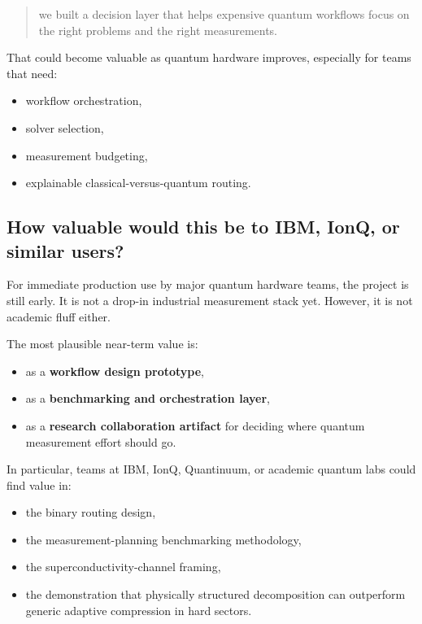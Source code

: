 \documentclass[11pt]{article}
\begin{document}
\begin{quote}
we built a decision layer that helps expensive quantum workflows focus on the right problems and the right measurements.
\end{quote}

That could become valuable as quantum hardware improves, especially for teams that need:

\begin{itemize}
\item workflow orchestration,
\item solver selection,
\item measurement budgeting,
\item explainable classical-versus-quantum routing.
\end{itemize}

\subsection{How valuable would this be to IBM, IonQ, or similar users?}

For immediate production use by major quantum hardware teams, the project is still early. It is not a drop-in industrial measurement stack yet. However, it is not academic fluff either.

The most plausible near-term value is:

\begin{itemize}
\item as a \textbf{workflow design prototype},
\item as a \textbf{benchmarking and orchestration layer},
\item as a \textbf{research collaboration artifact} for deciding where quantum measurement effort should go.
\end{itemize}

In particular, teams at IBM, IonQ, Quantinuum, or academic quantum labs could find value in:

\begin{itemize}
\item the binary routing design,
\item the measurement-planning benchmarking methodology,
\item the superconductivity-channel framing,
\item the demonstration that physically structured decomposition can outperform generic adaptive compression in hard sectors.
\end{itemize}
\end{document}
